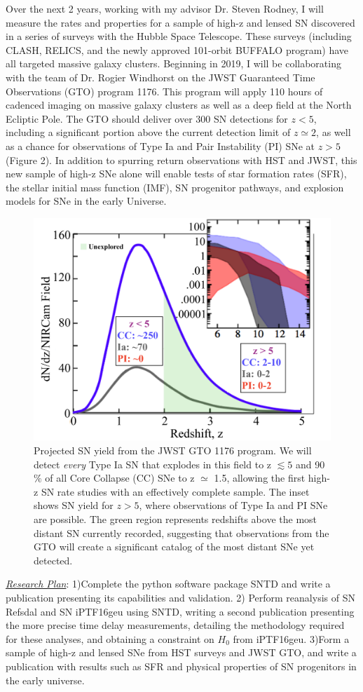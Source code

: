 Over the next 2 years, working with my advisor Dr. Steven Rodney, I
will measure the rates and properties for a sample of high-z and
lensed SN discovered in a series of surveys with the Hubble Space
Telescope. These surveys (including CLASH, RELICS, and the newly
approved 101-orbit BUFFALO program) have all targeted massive galaxy
clusters.  Beginning in 2019, I will be collaborating with the team of
Dr. Rogier Windhorst on the JWST Guaranteed Time Observations (GTO)
program 1176.  This program will apply 110 hours of cadenced imaging
on massive galaxy clusters as well as a deep field at the North
Ecliptic Pole.  The GTO should deliver over 300 SN detections for
$z<5$, including a significant portion above the current detection
limit of $z\simeq2$, as well as a chance for observations of Type Ia
and Pair Instability (PI) SNe at $z>5$ (Figure 2). In addition to
spurring return observations with HST and JWST, this new sample of
high-z SNe alone will enable tests of star formation rates (SFR), the stellar
initial mass function (IMF), SN progenitor pathways, and explosion models for SNe in the early
Universe.
\begin{figure}
\centering
\includegraphics[height=.4\textwidth]{FIG/jwst_rates2}
\caption{
\noindent\fontsize{10}{14}\selectfont
Projected SN yield from the JWST GTO 1176 program. We will
detect \textit{every} Type Ia SN that explodes in this field to z
$\lesssim5$ and 90$\%$ of all Core Collapse (CC) SNe to z $\simeq$
1.5, allowing the first high-z SN rate studies with an effectively
complete sample. The inset shows SN yield for $z>5$, where
observations of Type Ia and PI SNe are possible. The green region
represents redshifts above the most distant SN currently recorded,
suggesting that observations from the GTO will create a significant
catalog of the most distant SNe yet detected.}
\end{figure}

\noindent\underline{\textit{Research Plan}}:
1)Complete the python software package SNTD and write a publication
presenting its capabilities and validation. 2) Perform reanalysis of
SN Refsdal and SN iPTF16geu using SNTD, writing a second publication
presenting the more precise time delay measurements, detailing the
methodology required for these analyses, and obtaining a constraint on
$H_0$ from iPTF16geu. 3)Form a sample of high-z and lensed SNe from
HST surveys and JWST GTO, and write a publication with results such as
SFR and physical properties of SN progenitors in the early universe.

